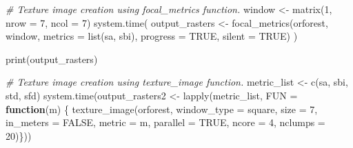 \documentclass[
]{article}
\newenvironment{Shaded}{\begin{snugshade}}{\end{snugshade}}
\newcommand{\AttributeTok}[1]{\textcolor[rgb]{0.77,0.63,0.00}{#1}}
\newcommand{\CommentTok}[1]{\textcolor[rgb]{0.56,0.35,0.01}{\textit{#1}}}
\newcommand{\ConstantTok}[1]{\textcolor[rgb]{0.00,0.00,0.00}{#1}}
\newcommand{\ControlFlowTok}[1]{\textcolor[rgb]{0.13,0.29,0.53}{\textbf{#1}}}
\newcommand{\DecValTok}[1]{\textcolor[rgb]{0.00,0.00,0.81}{#1}}
\newcommand{\FunctionTok}[1]{\textcolor[rgb]{0.00,0.00,0.00}{#1}}
\newcommand{\NormalTok}[1]{#1}
\newcommand{\OtherTok}[1]{\textcolor[rgb]{0.56,0.35,0.01}{#1}}
\newcommand{\StringTok}[1]{\textcolor[rgb]{0.31,0.60,0.02}{#1}}
\begin{document}
\begin{Shaded}
\begin{Highlighting}[]
\CommentTok{\# Texture image creation using \textquotesingle{}focal\_metrics\textquotesingle{} function.}
\NormalTok{window }\OtherTok{\textless{}{-}} \FunctionTok{matrix}\NormalTok{(}\DecValTok{1}\NormalTok{, }\AttributeTok{nrow =} \DecValTok{7}\NormalTok{, }\AttributeTok{ncol =} \DecValTok{7}\NormalTok{)}
\FunctionTok{system.time}\NormalTok{(}
\NormalTok{output\_rasters }\OtherTok{\textless{}{-}} \FunctionTok{focal\_metrics}\NormalTok{(orforest, window, }
                                \AttributeTok{metrics =} \FunctionTok{list}\NormalTok{(}\StringTok{\textquotesingle{}sa\textquotesingle{}}\NormalTok{, }\StringTok{\textquotesingle{}sbi\textquotesingle{}}\NormalTok{), }
                                \AttributeTok{progress =} \ConstantTok{TRUE}\NormalTok{, }\AttributeTok{silent =} \ConstantTok{TRUE}\NormalTok{)}
\NormalTok{)}

\FunctionTok{print}\NormalTok{(output\_rasters)}

\CommentTok{\# Texture image creation using \textquotesingle{}texture\_image\textquotesingle{} function.}
\NormalTok{metric\_list }\OtherTok{\textless{}{-}} \FunctionTok{c}\NormalTok{(}\StringTok{\textquotesingle{}sa\textquotesingle{}}\NormalTok{, }\StringTok{\textquotesingle{}sbi\textquotesingle{}}\NormalTok{, }\StringTok{\textquotesingle{}std\textquotesingle{}}\NormalTok{, }\StringTok{\textquotesingle{}sfd\textquotesingle{}}\NormalTok{)}
\FunctionTok{system.time}\NormalTok{(output\_rasters2 }\OtherTok{\textless{}{-}} \FunctionTok{lapply}\NormalTok{(metric\_list, }\AttributeTok{FUN =} \ControlFlowTok{function}\NormalTok{(m) \{}
  \FunctionTok{texture\_image}\NormalTok{(orforest, }\AttributeTok{window\_type =} \StringTok{\textquotesingle{}square\textquotesingle{}}\NormalTok{, }\AttributeTok{size =} \DecValTok{7}\NormalTok{,}
                                \AttributeTok{in\_meters =} \ConstantTok{FALSE}\NormalTok{, }\AttributeTok{metric =}\NormalTok{ m, }
                                \AttributeTok{parallel =} \ConstantTok{TRUE}\NormalTok{, }\AttributeTok{ncore =} \DecValTok{4}\NormalTok{, }\AttributeTok{nclumps =} \DecValTok{20}\NormalTok{)\}))}
\end{Highlighting}
\end{Shaded}
\end{document}
